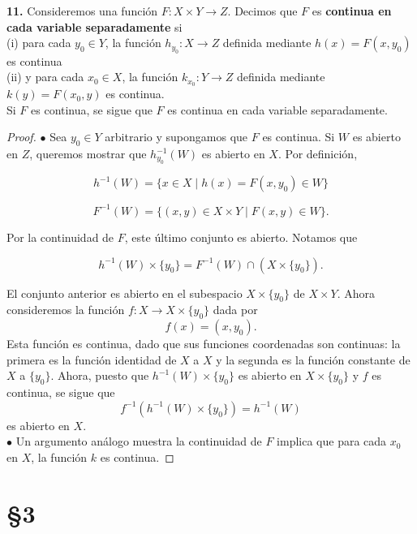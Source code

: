 \documentclass{article}
\begin{document}
\newpage

\begin{mybox}
	\textbf{11. } Consideremos una función $F: X \times Y \rightarrow Z$. Decimos que $F$ es \textbf{continua en cada variable separadamente} si \\
	
	(i) para cada $y_{0} \in Y$, la función $h_{y_{0}}: X \rightarrow Z$ definida mediante $h(x) = F(x, y_{0})$ es continua \\
	
	(ii) y para cada $x_{0} \in X$, la función $k_{x_{0}}: Y \rightarrow Z$ definida mediante $k(y) = F(x_{0}, y)$ es continua. \\
	
	Si $F$ es continua, se sigue que $F$ es continua en cada variable separadamente. 
\end{mybox}	
\begin{proof}
	$\bullet$ Sea $y_{0} \in Y$ arbitrario y supongamos que $F$ es continua. Si $W$ es abierto en $Z$, queremos mostrar que $h_{y_{0}}^{-1}(W)$ es abierto en $X$. Por definición,
	
	$$ h^{-1}(W) = \{ x \in X \mid h(x) =  F(x, y_{0}) \in W \} $$
	
	$$ F^{-1}(W) = \{ (x, y) \in X \times Y \mid F(x, y) \in W \} .$$
	
	Por la continuidad de $F$, este último conjunto es abierto. Notamos que 
	
	$$ h^{-1}(W) \times \{ y_{0} \} = F^{-1}(W) \cap (X \times \{ y_{0} \}) .$$
	
	El conjunto anterior es abierto en el subespacio $X \times \{ y_{0} \}$ de $X \times Y$. Ahora consideremos la función $f:X \rightarrow X \times \{ y_{0} \}$ dada por 
	$$ f(x) = (x, y_{0}). $$
	Esta función es continua, dado que sus funciones coordenadas son continuas: la primera es la función identidad de $X$ a $X$ y la segunda es la función constante de $X$ a $\{ y_{0} \}$. Ahora, puesto que $h^{-1}(W) \times \{ y_{0} \}$ es abierto en $X \times \{ y_{0} \}$ y $f$ es continua, se sigue que 
	$$ f^{-1}( h^{-1}(W) \times \{ y_{0} \} ) = h^{-1}(W)$$
	es abierto en $X$.  \\
	
$\bullet$ Un argumento análogo muestra la continuidad de $F$ implica que para cada $x_{0}$ en $X$, la función $k$ es continua. 
\end{proof}

\newpage

\section*{§3 }
\end{document}
